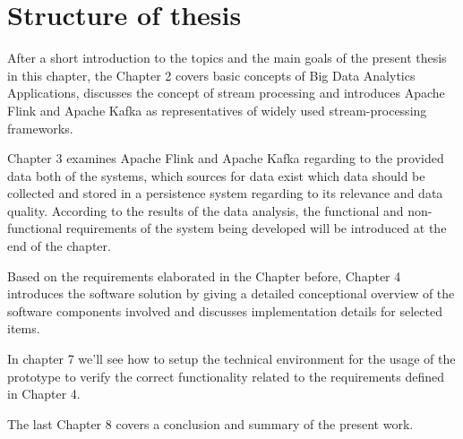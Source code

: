 \section{Structure of thesis}

After a short introduction to the topics and the main goals of the present thesis in this
chapter, the Chapter 2 covers basic concepts of Big Data Analytics Applications, discusses
the concept of stream processing and introduces Apache Flink and Apache Kafka as
representatives of widely used stream-processing frameworks.

Chapter 3 examines Apache Flink and Apache Kafka regarding to the provided data both of the systems,
which sources for data exist which data should be collected and stored in a persistence system regarding
to its relevance and data quality. According to the results of the data analysis, the functional and
non-functional requirements of the system being developed will be introduced at the end of the chapter.

Based on the requirements elaborated in the Chapter before, Chapter 4 introduces the software solution by
giving a detailed conceptional overview of the software components involved and discusses implementation
details for selected items.

In chapter 7 we'll see how to setup the technical environment for the usage of the prototype
to verify the correct functionality related to the requirements defined in Chapter 4.

The last Chapter 8 covers a conclusion and summary of the present work.